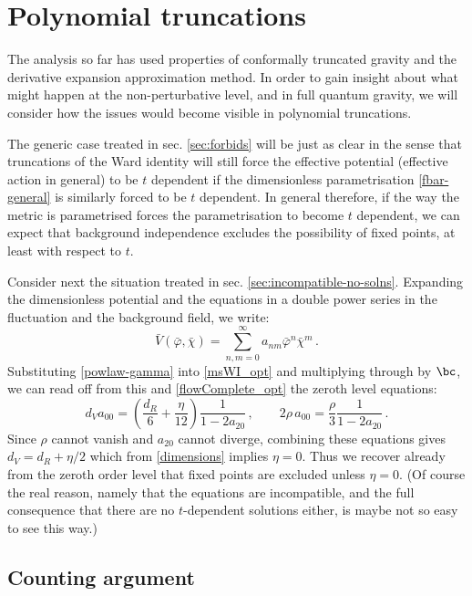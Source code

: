 \documentclass[11pt]{book} %
\newcommand{\be}{\begin{equation}}
\newcommand{\ee}{\end{equation}}
\begin{document}
\section{Polynomial truncations}
\label{sec:truncations} 

The analysis  so far has used properties of conformally truncated gravity and the derivative expansion approximation method. In order to gain insight about what might happen at the non-perturbative level, and in full quantum gravity, we will consider how the issues would become visible in polynomial truncations. 

The generic case treated in sec. \ref{sec:forbids} will be just as clear in the sense that truncations of the Ward identity will still force the effective potential (effective action in general) to be $t$ dependent if the dimensionless parametrisation \eqref{fbar-general} is similarly forced to be $t$ dependent. In general therefore, if the way the metric is parametrised forces the parametrisation to become $t$ dependent, we can expect that background independence excludes the possibility of fixed points, at least with respect to $t$.


Consider next the situation treated in sec. \ref{sec:incompatible-no-solns}. Expanding the dimensionless potential and the equations in a double power series in the fluctuation and the background field, we write:
\begin{equation}
\label{pot-expand}
\bar V(\bar\varphi,\bar\chi) = \sum_{n,m=0}^{\infty} a_{nm} \bar\varphi^n \bar\chi^m\,.
\end{equation}
Substituting \eqref{powlaw-gamma} into \eqref{msWI_opt} and multiplying through by $\bc$, we can read off from this and \eqref{flowComplete_opt} the zeroth level equations:
\be 
d_V a_{00} = \left(  \frac{d_R}{6} + \frac{\eta}{12} \right) \frac{1}{1 -  2a_{20}}\,,\qquad 2\rho\, a_{00} = \frac{\rho}{3} \frac{1}{1 -  2a_{20}}\,.
\ee
Since $\rho$ cannot vanish and $a_{20}$ cannot diverge, combining these equations gives $d_V = d_R+\eta/2$ which from \eqref{dimensions} implies $\eta=0$. Thus we recover already from the zeroth order level that fixed points are excluded unless $\eta=0$. (Of course the real reason, namely that the equations are incompatible, and the full consequence that there are no $t$-dependent solutions either, is maybe not so easy to see this way.)

\subsection{Counting argument}\label{sec:counting}
\end{document}
